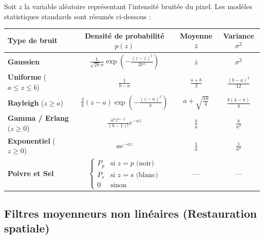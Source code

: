 \begin{proposition}
    Soit $z$ la variable aléatoire représentant l'intensité bruitée du pixel. Les modèles statistiques standards sont résumés ci-dessous :
    \begin{center}
        \renewcommand{\arraystretch}{2.0}
        \begin{tabular}{lccc}
            \toprule
            \textbf{Type de bruit} & \textbf{Densité de probabilité} $p(z)$ & \textbf{Moyenne} $\bar{z}$ & \textbf{Variance} $\sigma^2$ \\
            \midrule
            \textbf{Gaussien} & $\displaystyle \frac{1}{\sqrt{2\pi}\sigma} \exp \left(-\frac{(z - \bar{z})^2}{2\sigma^2}\right)$ & $\bar{z}$ & $\sigma^2$ \\
            \textbf{Uniforme} ($a \leqslant z \leqslant b$) & $\displaystyle \frac{1}{b - a}$ & $\displaystyle \frac{a + b}{2}$ & $\displaystyle \frac{(b - a)^2}{12}$ \\
            \textbf{Rayleigh} ($z \geqslant a$) & $\displaystyle \frac{2}{b}(z - a) \exp \left( -\frac{(z - a)^2}{b} \right)$ & $\displaystyle a + \sqrt{\frac{\pi b}{4}}$ & $\displaystyle \frac{b(4 - \pi)}{4}$ \\
            \textbf{Gamma / Erlang} ($z \geqslant 0$) & $\displaystyle \frac{a^b z^{b-1}}{(b - 1)!} e^{-az}$ & $\displaystyle \frac{b}{a}$ & $\displaystyle \frac{b}{a^2}$ \\
            \textbf{Exponentiel} ($z \geqslant 0$) & $\displaystyle a e^{-az}$ & $\displaystyle \frac{1}{a}$ & $\displaystyle \frac{1}{a^2}$ \\
            \textbf{Poivre et Sel} & $\begin{cases} P_p & \text{si } z = p \text{ (noir)} \\ P_s & \text{si } z = s \text{ (blanc)} \\ 0 & \text{sinon} \end{cases}$ & --- & --- \\
            \bottomrule
        \end{tabular}
    \end{center}
\end{proposition}

\subsection{Filtres moyenneurs non linéaires (Restauration spatiale)}

